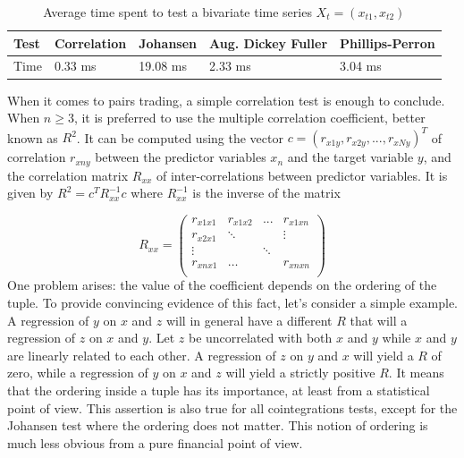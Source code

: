 \documentclass[11pt,a4,twosided,singlespacing,titlepagenumber=on]{scrreprt}
\numberwithin{equation}{chapter} %
\theoremstyle{remark}
\begin{document}
\begin{table}[h]
\centering
\label{table1}
\begin{tabular}{|l|l|l|l|l|}
\hline
Test     & Correlation & Johansen & Aug. Dickey Fuller & Phillips-Perron \\ \hline
Time & 0.33 ms   & 19.08 ms      & 2.33 ms      & 3.04 ms        \\ \hline
\end{tabular}
\caption{Average time spent to test a bivariate time series $X_t = (x_{t1}, x_{t2})$}
\end{table}

\noindent
When it comes to pairs trading, a simple correlation test is enough to conclude. When $n \geq 3$, it is preferred to use the multiple correlation coefficient, better known as $R^2$. It can be computed using the vector $c = (r_{x1y}, r_{x2y},...,r_{xNy})^T$ of correlation $r_{xny}$ between the predictor variables $x_n$ and the target variable $y$, and the correlation matrix $R_{xx}$ of inter-correlations between predictor variables. It is given by $R^2 = c^T R_{xx}^{-1}c$ where $R_{xx}^{-1}$ is the inverse of the matrix

$$R_{xx} =\begin{pmatrix}
r_{x1x1}    & r_{x1x2} & ...  & r_{x1xn}  \\
r_{x2x1}    & \ddots &   & \vdots  \\
\vdots       &   & \ddots &   \\
r_{xnx1}    & \hdots &   & r_{xnxn} \\
\end{pmatrix} $$
One problem arises: the value of the coefficient depends on the ordering of the tuple. To provide convincing evidence of this fact, let's consider a simple example. A regression of $y$ on $x$ and $z$ will in general have a different $R$ that will a regression of $z$ on $x$ and $y$. Let $z$ be uncorrelated with both $x$ and $y$ while $x$ and $y$ are linearly related to each other. A regression of $z$ on $y$ and $x$ will yield a $R$ of zero, while a regression of $y$ on $x$ and $z$ will yield a strictly positive $R$. It means that the ordering inside a tuple has its importance, at least from a statistical point of view. This assertion is also true for all cointegrations tests, except for the Johansen test where the ordering does not matter. This notion of ordering is much less obvious from a pure financial point of view. \\
\end{document}
